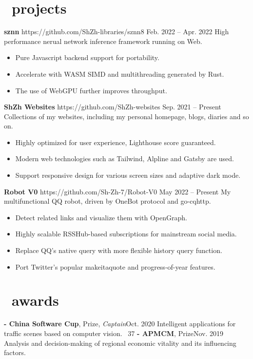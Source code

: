\documentclass{common}
\begin{document}
\section{\faCubes\ projects}
\projectsubsection
    {\textbf{sznn}}
    {https://github.com/ShZh-libraries/sznn}{8}
    {Feb. 2022 -- Apr. 2022}
High performance nerual network inference framework running on Web.
\begin{itemize}
    \item Pure Javascript backend support for portability.
    \item Accelerate with WASM SIMD and multithreading generated by Rust.
    \item The use of WebGPU further improves throughput.
\end{itemize}
\projectsubsectionwithoutstar
    {\textbf{ShZh Websites}}
    {https://github.com/ShZh-websites}
    {Sep. 2021 -- Present}
Collections of my websites, including my personal homepage, blogs, diaries and so on.
\begin{itemize}
    \item Highly optimized for user experience, Lighthouse score guaranteed.
    \item Modern web technologies such as Tailwind, Alpline and Gatsby are used.
    \item Support responsive design for various screen sizes and adaptive dark mode.
\end{itemize}
\projectsubsectionwithoutstar
    {\textbf{Robot V0}}
    {https://github.com/Sh-Zh-7/Robot-V0}
    {May 2022 -- Present}
My multifunctional QQ robot, driven by OneBot protocol and go-cqhttp.
\begin{itemize}
    \item Detect related links and visualize them with OpenGraph.
    \item Highly scalable RSSHub-based subscriptions for mainstream social media.
    \item Replace QQ's native query with more flexible history query function.
    \item Port Twitter's popular makeitaquote and progress-of-year features.
\end{itemize}

\vspace{0.85ex}

\section{\faTrophy\ awards}
\award
    {\textbf{- China Software Cup},  Prize, \textit{Captain}}{Oct. 2020}
    {Intelligent applications for traffic scenes based on computer vision. 
        {\href{https://github.com/Sh-Zh-7/intelligent-transportation-system}{\underline{\faGithub}} \faStarO\ 37}
    }
\vspace{0.5ex}
\award
    {\textbf{- APMCM},  Prize}{Nov. 2019}
    {Analysis and decision-making of regional economic vitality and its influencing factors.}
\end{document}
